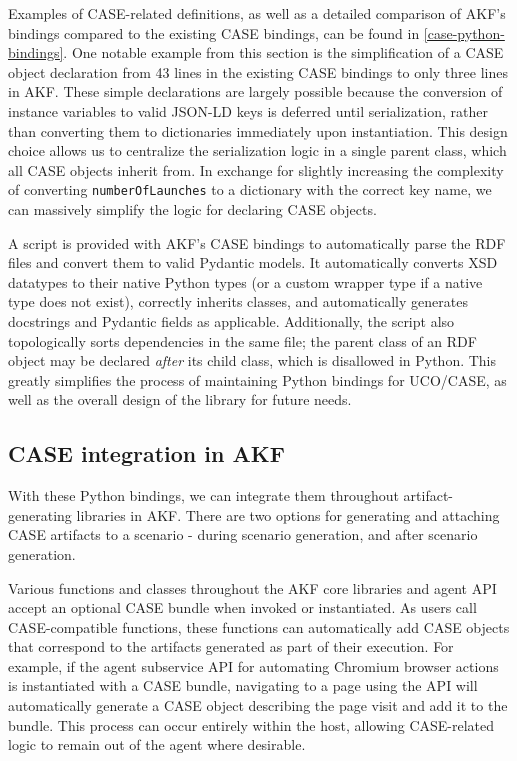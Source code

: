 \documentclass[letterpaper,12pt]{report}
\newcommand{\passthrough}[1]{#1}
\begin{document}
Examples of CASE-related definitions, as well as a detailed comparison
of AKF's bindings compared to the existing CASE bindings, can be found
in \autoref{case-python-bindings}. One notable
example from this section is the simplification of a CASE object
declaration from 43 lines in the existing CASE bindings to only three
lines in AKF. These simple declarations are largely possible because the
conversion of instance variables to valid JSON-LD keys is deferred until
serialization, rather than converting them to dictionaries immediately
upon instantiation. This design choice allows us to centralize the
serialization logic in a single parent class, which all CASE objects
inherit from. In exchange for slightly increasing the complexity of
converting \passthrough{\lstinline!numberOfLaunches!} to a dictionary
with the correct key name, we can massively simplify the logic for
declaring CASE objects.

A script is provided with AKF's CASE bindings to automatically parse the
RDF files and convert them to valid Pydantic models. It automatically
converts XSD datatypes to their native Python types (or a custom wrapper
type if a native type does not exist), correctly inherits classes, and
automatically generates docstrings and Pydantic fields as applicable.
Additionally, the script also topologically sorts dependencies in the
same file; the parent class of an RDF object may be declared
\emph{after} its child class, which is disallowed in Python. This
greatly simplifies the process of maintaining Python bindings for
UCO/CASE, as well as the overall design of the library for future needs.

\subsection{CASE integration in
AKF}\label{case-integration-in-akf}

With these Python bindings, we can integrate them throughout
artifact-generating libraries in AKF. There are two options for
generating and attaching CASE artifacts to a scenario - during scenario
generation, and after scenario generation.

Various functions and classes throughout the AKF core libraries and
agent API accept an optional CASE bundle when invoked or instantiated.
As users call CASE-compatible functions, these functions can
automatically add CASE objects that correspond to the artifacts
generated as part of their execution. For example, if the agent
subservice API for automating Chromium browser actions is instantiated
with a CASE bundle, navigating to a page using the API will
automatically generate a CASE object describing the page visit and add
it to the bundle. This process can occur entirely within the host,
allowing CASE-related logic to remain out of the agent where desirable.
\end{document}
